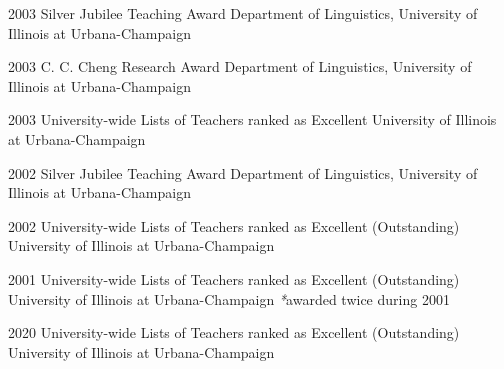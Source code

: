 \begin{cvskills}

    \cvskill
    {2003} %
    {Silver Jubilee Teaching Award} %
    {Department of Linguistics, University of Illinois at Urbana-Champaign} %
    
    \cvskill
    {2003} %
    {C. C. Cheng Research Award} %
    {Department of Linguistics, University of Illinois at Urbana-Champaign} %

    \cvskill
    {2003} %
    {University-wide Lists of Teachers ranked as Excellent} %
    {University of Illinois at Urbana-Champaign} %


    \cvskill
    {2002} %
    {Silver Jubilee Teaching Award} %
    {Department of Linguistics, University of Illinois at Urbana-Champaign} %

    \cvskill
    {2002} %
    {University-wide Lists of Teachers ranked as Excellent (Outstanding)} %
    {University of Illinois at Urbana-Champaign} %
    
    \cvskill
    {2001} %
    {University-wide Lists of Teachers ranked as Excellent (Outstanding)} %
    {University of Illinois at Urbana-Champaign \scriptsize{\textit{*}awarded twice during 2001}} %

    \cvskill
    {2020} %
    {University-wide Lists of Teachers ranked as Excellent (Outstanding)} %
    {University of Illinois at Urbana-Champaign} %


\end{cvskills}

